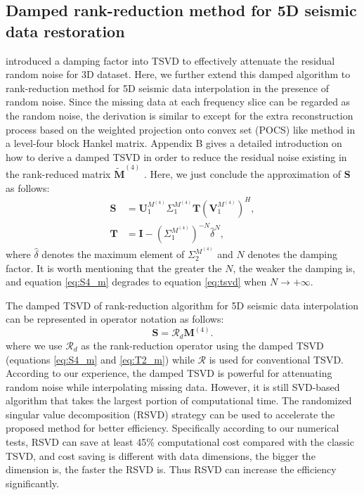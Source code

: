 \subsection{Damped rank-reduction method for 5D seismic data restoration}
\cite{weilin} introduced a damping factor into TSVD to effectively attenuate the residual random noise for 3D dataset. Here, we further extend this damped algorithm to rank-reduction method for 5D seismic data interpolation in the presence of random noise. Since the missing data at each frequency slice can be regarded as the random noise, the derivation is similar to \cite{weilin} except for the extra reconstruction process based on the weighted projection onto convex set (POCS) like method in a level-four block Hankel matrix. Appendix B
gives a detailed introduction on how to derive a damped TSVD in order to reduce the residual noise
existing in the rank-reduced matrix $\tilde{\mathbf{M}}^{(4)}$ . Here, we just conclude the approximation of $\mathbf{S}$ as follows:
\begin{align}
\label{eq:S4_m}
\mathbf{S} & = \mathbf{U}_1^{M^{(4)}} \Sigma_1^{M^{(4)}}\mathbf{T}(\mathbf{V}_1^{M^{(4)}})^H,\\
\label{eq:T2_m}
\mathbf{T} & =\mathbf{I}-(\Sigma_1^{M^{(4)}})^{-N}\hat{\delta}^N,
\end{align}
where $\hat{\delta}$ denotes the maximum element of $\Sigma_2^{M^{(4)}}$ and $N$ denotes the damping factor. It is worth mentioning that the greater the $N$, the weaker the damping is, and equation \ref{eq:S4_m} degrades to equation \ref{eq:tsvd} when $N\rightarrow +\infty$.

The damped TSVD of rank-reduction algorithm for 5D seismic data interpolation can be represented in operator notation as follows:
\begin{equation}
\label{eq:rankrdopt}
\mathbf{S}=\mathcal{R}_d\mathbf{M}^{(4)}.
\end{equation}
where we use $\mathcal{R}_d$ as the rank-reduction operator using the damped TSVD (equations \ref{eq:S4_m} and \ref{eq:T2_m}) while $\mathcal{R}$ is used for conventional TSVD. According to our experience, the damped TSVD is powerful for attenuating random noise while interpolating missing data. However, it is still SVD-based algorithm that takes the largest portion of computational time. The randomized singular value decomposition (RSVD) strategy \cite[]{rokhlin,halko11,mssa} can be used to accelerate the proposed method for better efficiency. Specifically according to our numerical tests, RSVD can save at least 45\% computational cost compared with the classic TSVD, and cost saving is different with data dimensions, the bigger the dimension is, the faster the RSVD is. Thus RSVD can increase the efficiency significantly.

